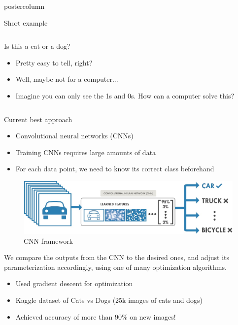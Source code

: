 \documentclass{beamer}
\begin{document}
\begin{frame}
\begin{columns}
\begin{column}{.57\textwidth}
\begin{beamercolorbox}[center]{postercolumn}
\begin{minipage}{.98\textwidth}
{\begin{myblock}{Short example}
\begin{columns}
					        \begin{column}{0.5\textwidth}
					            Is this a cat or a dog?
					            \begin{itemize}
					                \item Pretty easy to tell, right?
					                \item Well, maybe not for a computer...
					                \item Imagine you can only see the 1s and 0s. How can a computer solve this?
					            \end{itemize}
					        \end{column}
					    \end{columns}
					    
					    \vspace{1cm}
					    Current best approach
					    \vspace{1cm}
					    \begin{itemize}
					        \item Convolutional neural networks (CNNs)
					        \item Training CNNs requires large amounts of data
					        \item For each data point, we need to know its correct class beforehand
					    \end{itemize}
					    
					    \vspace{1cm}
					    \begin{figure}
					        \centering
					        \includegraphics[scale=0.9]{img/cnn.jpg}
					        \caption{CNN framework}
					        \label{fig:my_label}
					    \end{figure}
					    
					    We compare the outputs from the CNN to the desired ones, and adjust its parameterization accordingly, using one of many optimization algorithms.
					    \vspace{1cm}
					    \begin{itemize}
					        \item Used gradient descent\cite{Paivi} for optimization
					        \item Kaggle dataset of Cats vs Dogs \cite{Oegren2008} (25k images of cats and dogs)
					        \item Achieved accuracy of more than 90\% on new images!
					    \end{itemize}
					    					    

\end{myblock}}
\end{minipage}
\end{beamercolorbox}
\end{column}
\end{columns}
\end{frame}
\end{document}
